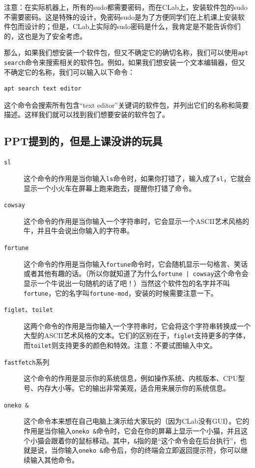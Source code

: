 \documentclass[12pt]{ctexart}
\begin{document}
注意：在实际机器上，所有的sudo都需要密码，而在CLab上，安装软件包的sudo不需要密码。这是特殊的设计，免密码sudo是为了方便同学们在上机课上安装软件包而设计的；但是，CLab上实际的sudo密码是什么，我肯定是不能告诉你们的，这也是为了安全考虑。

那么，如果我们想安装一个软件包，但又不确定它的确切名称，我们可以使用\texttt{apt search}命令来搜索相关的软件包。例如，如果我们想安装一个文本编辑器，但又不确定它的名称，我们可以输入以下命令：
\begin{verbatim}
apt search text editor
\end{verbatim}
这个命令会搜索所有包含“text editor”关键词的软件包，并列出它们的名称和简要描述。这样我们就可以找到我们想要安装的软件包了。

\subsection{PPT提到的，但是上课没讲的玩具}

\begin{description}
    \item[\texttt{sl}] 这个命令的作用是当你输入\texttt{ls}命令时，如果你打错了，输入成了\texttt{sl}，它就会显示一个小火车在屏幕上跑来跑去，提醒你打错了命令。
    \item[\texttt{cowsay}] 这个命令的作用是当你输入一个字符串时，它会显示一个ASCII艺术风格的牛，并且牛会说出你输入的字符串。 
    \item[\texttt{fortune}] 这个命令的作用是当你输入\texttt{fortune}命令时，它会随机显示一句格言、笑话或者其他有趣的话。（所以你就知道了为什么\texttt{fortune | cowsay}这个命令会显示一个牛说出一句随机的话了吧！）当然这个软件包的名字并不叫\texttt{fortune}，它的名字叫\texttt{fortune-mod}，安装的时候需要注意一下。
    \item[\texttt{figlet}、\texttt{toilet}] 这两个命令的作用是当你输入一个字符串时，它会将这个字符串转换成一个大型的ASCII艺术风格的文本。它们的区别在于，\texttt{figlet}支持更多的字体，而\texttt{toilet}则支持更多的颜色和特效。注意：不要试图输入中文。
    \item[\texttt{fastfetch}系列] 这个命令的作用是显示你的系统信息，例如操作系统、内核版本、CPU型号、内存大小等。它的输出非常美观，适合用来展示你的系统信息。  
    \item[\texttt{oneko \&}] 这个命令本来想在自己电脑上演示给大家玩的（因为CLab没有GUI）。它的作用是当你输入\texttt{oneko \&}命令时，它会在你的屏幕上显示一个小猫，并且这个小猫会跟着你的鼠标移动。其中，\texttt{\&}指的是“这个命令会在后台执行”，也就是说，当你输入\texttt{oneko \&}命令后，你的终端会立即返回提示符，你可以继续输入其他命令。
\end{description}
\end{document}

